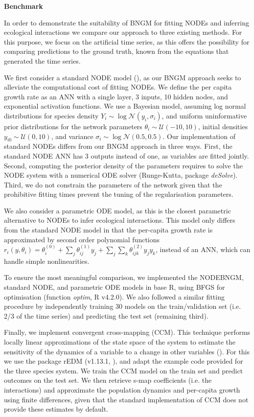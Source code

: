 \documentclass[11pt, oneside]{article}
\begin{document}
\textbf{Benchmark}

In order to demonstrate the suitability of BNGM for fitting NODEs and inferring ecological interactions we compare our approach to three existing methods.
For this purpose, we focus on the artificial time series, as this offers the possibility for comparing predictions to the ground truth, known from the equations that generated the time series.

We first consider a standard NODE model (\cite{Bonnaffe2021a}), as our BNGM approach seeks to alleviate the computational cost of fitting NODEs.
We define the per capita growth rate as an ANN with a single layer, 3 inputs, 10 hidden nodes, and exponential activation functions.
We use a Bayesian model, assuming log normal distributions for species density $Y_i \sim \log\mathcal{N}(y_i,\sigma_i)$, and uniform uninformative prior distributions for the network parameters $\theta_i \sim \mathcal{U}(-10,10)$, initial densities $y_{i0} \sim \mathcal{U}(0,10)$, and variance $\sigma_i \sim \log\mathcal{N}(0.5,0.5)$.
Our implementation of standard NODEs differs from our BNGM approach in three ways.
First, the standard NODE ANN has 3 outputs instead of one, as variables are fitted jointly.
Second, computing the posterior density of the parameters requires to solve the NODE system with a numerical ODE solver (Runge-Kutta, package \textit{deSolve}).
Third, we do not constrain the parameters of the network given that the prohibitive fitting times prevent the tuning of the regularisation parameters.

We also consider a parametric ODE model, as this is the closest parametric alternative to NODEs to infer ecological interactions.
This model only differs from the standard NODE model in that the per-capita growth rate is approximated by second order polynomial functions $r_i(y,\theta_i) = \theta_i^{(0)} + \sum_j \theta_{ij}^{(1)} y_j + \sum_j \sum_k \theta_{ijk}^{(2)} y_{j} y_{k}$, instead of an ANN, which can handle simple nonlinearities.

To ensure the most meaningful comparison, we implemented the NODEBNGM, standard NODE, and parametric ODE models in base R, using BFGS for optimisation (function \textit{optim}, R v4.2.0).
We also followed a similar fitting procedure by independently training 30 models on the train/validation set (i.e. 2/3 of the time series) and predicting the test set (remaining third).

Finally, we implement convergent cross-mapping (CCM).
This technique performs locally linear approximations of the state space of the system to estimate the sensitivity of the dynamics of a variable to a change in other variables (\cite{Sugihara2012}).
For this we use the package rEDM (v1.13.1, \cite{Sugihara2012}), and adapt the example code provided for the three species system.
We train the CCM model on the train set and predict outcomes on the test set.
We then retrieve s-map coefficients (i.e. the interactions) and approximate the population dynamics and per-capita growth using finite differences, given that the standard implementation of CCM does not provide these estimates by default.
\end{document}
